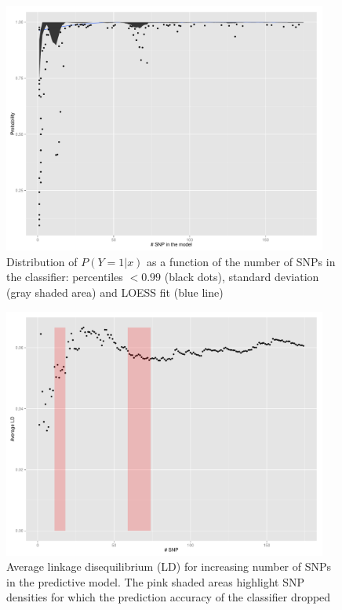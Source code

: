 \begin{figure}
\includegraphics[width=0.95\textwidth]{probabilities.pdf}
\caption{Distribution of $P(Y=1|x)$ as a function of the number of SNPs
  in the classifier: percentiles $<0.99$ (black dots), standard
  deviation (gray shaded area) and LOESS fit (blue line)}
\label{fig:probability} 
\end{figure}


\begin{figure}
\includegraphics[width=0.95\textwidth]{LD.pdf}
\caption{Average linkage disequilibrium (LD) for increasing number of
  SNPs in the predictive model. The pink shaded areas highlight SNP
  densities for which the prediction accuracy of the classifier dropped}
\label{fig:ld} 
\end{figure}

